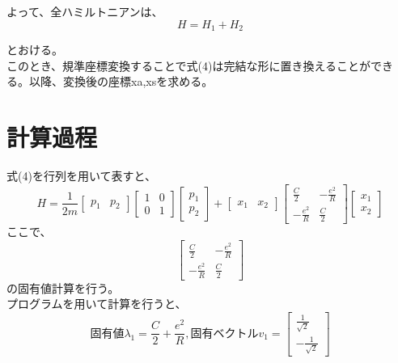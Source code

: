 \documentclass{jsarticle}
\begin{document}
	よって、全ハミルトニアンは、
		\begin{equation}
			H=H_{1}+H_{2}
		\end{equation}

	とおける。\\
	このとき、規準座標変換することで式(4)は完結な形に置き換えることができる。以降、変換後の座標xa,xsを求める。

	\section{計算過程}
	式(4)を行列を用いて表すと、
	\begin{equation}
		H=\frac{1}{2m}
		\begin{bmatrix}
		p_1 & p_2
		\end{bmatrix}
		\begin{bmatrix}
			1 & 0 \\
			0 & 1
		\end{bmatrix}
		\begin{bmatrix}
			p_1 \\
			p_2
		\end{bmatrix}
		+
		\begin{bmatrix}
		x_1 & x_2
		\end{bmatrix}
		\begin{bmatrix}
		\frac{C}{2} & -\frac{e^{2}}{R} \\
		-\frac{e^{2}}{R} & \frac{C}{2}
		\end{bmatrix}
		\begin{bmatrix}
		x_1 \\
		x_2
		\end{bmatrix}
	\end{equation}
	ここで、
	\begin{equation}
	\begin{bmatrix}
	\frac{C}{2} & -\frac{e^{2}}{R} \\
	-\frac{e^{2}}{R} & \frac{C}{2}
	\end{bmatrix}
	\end{equation}
	の固有値計算を行う。\\
	プログラムを用いて計算を行うと、
	\begin{equation}
	固有値 \lambda_1 = \frac{C}{2}+\frac{e^{2}}{R},
	固有ベクトル v_1=
	\begin{bmatrix}
	\frac{1}{\sqrt{2}} \\
	-\frac{1}{\sqrt{2}}
	\end{bmatrix}
	\end{equation}
\end{document}
